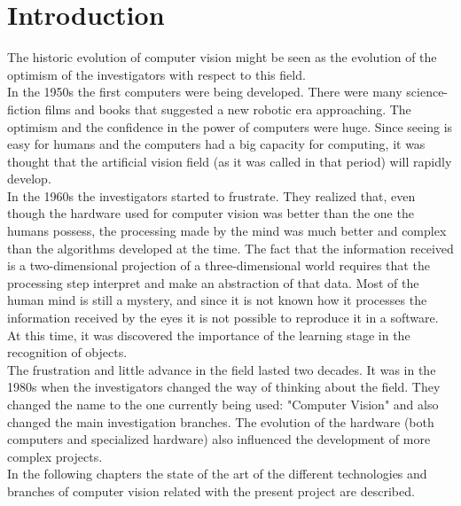 \chapter{Introduction}

The historic evolution of computer vision might be seen as the evolution of the optimism of the investigators with respect to this field. 
\\

In the 1950s the first computers were being developed. There were many science-fiction films and books that suggested a new robotic era approaching. The optimism and the confidence in the power of computers were huge. 
Since seeing is easy for humans and the computers had a big capacity for computing, it was thought that the artificial vision field (as it was called in that period) will rapidly develop. 
\\

In the 1960s the investigators started to frustrate. They realized that, even though the hardware used for computer vision was better than the one the humans possess, the processing made by the mind was much better and complex than the algorithms developed at the time. 
The fact that the information received is a two-dimensional projection of a three-dimensional world requires that the processing step interpret and make an abstraction of that data. Most of the human mind is still a mystery, and since it is not known how it processes the information received by the eyes it is not possible to reproduce it in a software. 
At this time, it was discovered the importance of the learning stage in the recognition of objects. 
\\

The frustration and little advance in the field lasted two decades. It was in the 1980s when the investigators changed the way of thinking about the field. They changed the name to the one currently being used: "Computer Vision" and also changed the main investigation branches.
The evolution of the hardware (both computers and specialized hardware) also influenced the development of more complex projects. 
\\

In the following chapters the state of the art of the different technologies and branches of computer vision related with the present project are described. 
